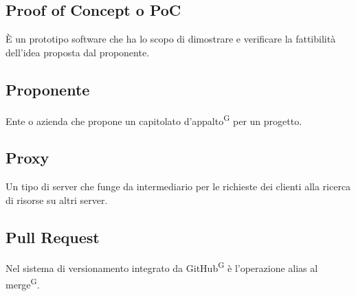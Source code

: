 \subsection{Proof of Concept o PoC}
È un prototipo software che ha lo scopo di dimostrare e verificare la fattibilità dell'idea proposta dal proponente.

\subsection{Proponente}
Ente o azienda che propone un capitolato d'appalto\textsuperscript{G} per un progetto.

\subsection{Proxy}
Un tipo di server che funge da intermediario per le richieste dei clienti alla ricerca di risorse su altri server.

\subsection{Pull Request}
Nel sistema di versionamento integrato da GitHub\textsuperscript{G} è l'operazione alias al merge\textsuperscript{G}.

\clearpage